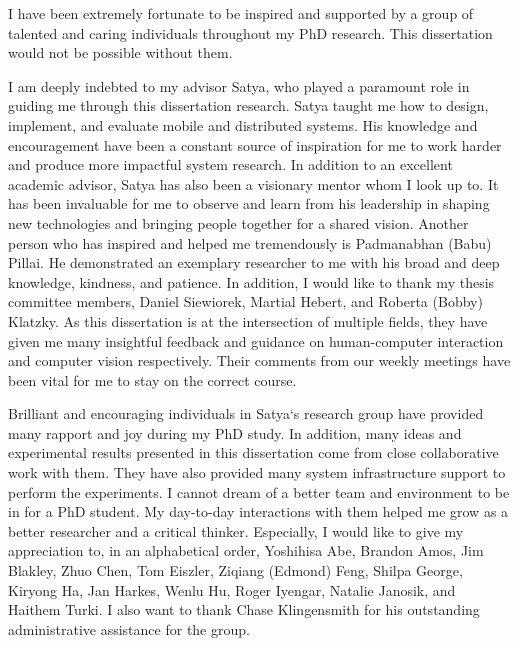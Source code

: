 \begin{acknowledgments}
    I have been extremely fortunate to be inspired and supported by a group of
    talented and caring individuals throughout my PhD research. This
    dissertation would not be possible without them.

    I am deeply indebted to my advisor Satya, who played a paramount role in
    guiding me through this dissertation research. Satya taught me how to
    design, implement, and evaluate mobile and distributed systems. His
    knowledge and encouragement have been a constant source of inspiration for
    me to work harder and produce more impactful system research. In addition to
    an excellent academic advisor, Satya has also been a visionary mentor whom I
    look up to. It has been invaluable for me to observe and learn from his
    leadership in shaping new technologies and bringing people together for a
    shared vision. Another person who has inspired and helped me tremendously is
    Padmanabhan (Babu) Pillai. He demonstrated an exemplary researcher to me
    with his broad and deep knowledge, kindness, and patience. In addition, I
    would like to thank my thesis committee members, Daniel Siewiorek, Martial
    Hebert, and Roberta (Bobby) Klatzky. As this dissertation is at the
    intersection of multiple fields, they have given me many insightful feedback
    and guidance on human-computer interaction and computer vision respectively.
    Their comments from our weekly meetings have been vital for me to stay on
    the correct course.

    Brilliant and encouraging individuals in Satya`s research group have
    provided many rapport and joy during my PhD study. In addition, many ideas
    and experimental results presented in this dissertation come from close
    collaborative work with them. They have also provided many system
    infrastructure support to perform the experiments. I cannot dream of a
    better team and environment to be in for a PhD student. My day-to-day
    interactions with them helped me grow as a better researcher and a critical
    thinker. Especially, I would like to give my appreciation to, in an
    alphabetical order, Yoshihisa Abe, Brandon Amos, Jim Blakley, Zhuo Chen, Tom
    Eiszler, Ziqiang (Edmond) Feng, Shilpa George, Kiryong Ha, Jan Harkes, Wenlu
    Hu, Roger Iyengar, Natalie Janosik, and Haithem Turki. I also want to thank
    Chase Klingensmith for his outstanding administrative assistance for the
    group.


\end{acknowledgments}
